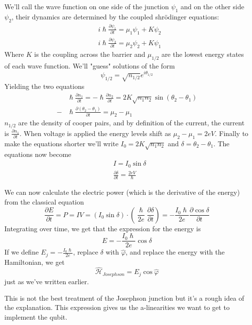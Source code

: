 We'll call the wave function on one side of the junction $\psi_1$ and on the other side $\psi_2$, their dynamics are determined by the coupled shr\"{o}dinger equations:
\begin{align*}
    &i\hslash\frac{\partial \psi_1}{\partial t} = \mu_1 \psi_1 + K \psi_2 \\
    &i\hslash\frac{\partial \psi_2}{\partial t} = \mu_2 \psi_2 + K \psi_1 
\end{align*}
Where $K$ is the coupling across the barrier and $\mu_{1/2}$ are the lowest energy states of each wave function. We'll "guess" solutions of the form
\[
    \psi_{1/2} = \sqrt{n_{1/2}}e^{i\theta_{1/2}}
\]
Yielding the two equations
\begin{align*}
    &\hslash \frac{\partial n_1}{\partial t} = - \hslash \frac{\partial n_2}{\partial t} = 2K \sqrt{n_1 n_2} \sin (\theta_2 - \theta_1) \\
    -&\hslash \frac{\partial (\theta_2 - \theta_1)}{\partial t} = \mu_2 - \mu_1
\end{align*}
$n_{1/2}$ are the density of cooper pairs, and by definition of the current, the current is $\frac{\partial n_1}{\partial t}$. When voltage is applied the energy levels shift as $\mu_2 - \mu_1 = 2eV$. Finally to make the equations shorter we'll write $I_0 = 2K\sqrt{n_1 n_2}$ and $\delta = \theta_2 - \theta_1$. The equations now become
\begin{align*}
    &I = I_0 \sin \delta \\
    &\frac{\partial \delta}{\partial t} = \frac{2eV}{\hslash}
\end{align*}

We can now calculate the electric power (which is the derivative of the energy) from the classical equation
\[
    \frac{\partial E}{\partial t} = P = I V = (I_0 \sin \delta) \cdot (\frac{\hslash}{2e} \frac{\partial \delta}{\partial t}) = -\frac{I_0 \hslash}{2e} \frac{\partial \cos \delta}{\partial t}
\]
Integrating over time, we get that the expression for the energy is
\[
    E = -\frac{I_0 \hslash}{2e} \cos \delta
\]
If we define $E_j = -\frac{I_0 \hslash}{2e}$, replace $\delta$ with $\hat{\varphi}$, and replace the energy with the Hamiltonian, we get
\[
    \hat{\mathcal{H}}_{Josephson} = E_j \cos \hat{\varphi}
\]
just as we've written earlier.

This is not the best treatment of the Josephson junction but it's a rough idea of the explanation. This expression gives us the a-linearities we want to get to implement the qubit.